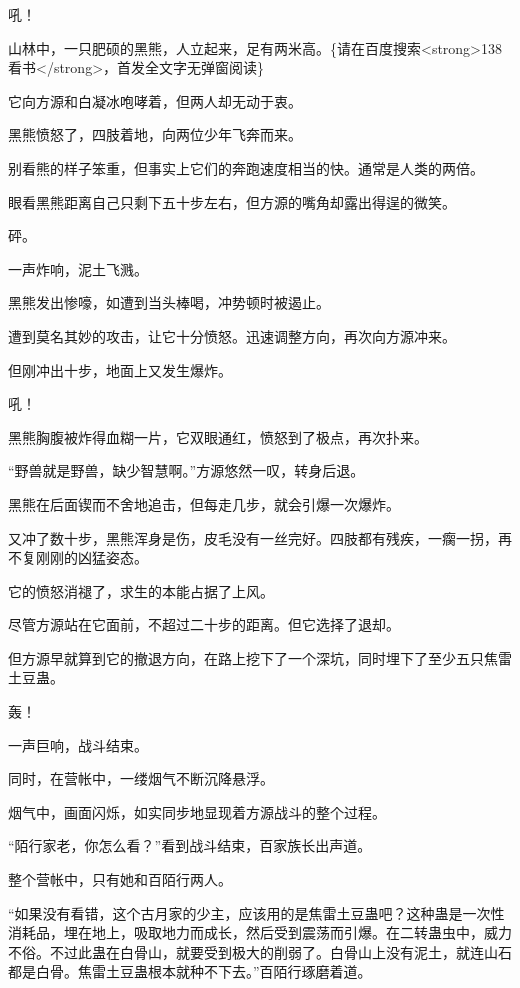 
\begin{this_body}

吼！

山林中，一只肥硕的黑熊，人立起来，足有两米高。\{请在百度搜索<strong>138看书</strong>，首发全文字无弹窗阅读\}

它向方源和白凝冰咆哮着，但两人却无动于衷。

黑熊愤怒了，四肢着地，向两位少年飞奔而来。

别看熊的样子笨重，但事实上它们的奔跑速度相当的快。通常是人类的两倍。

眼看黑熊距离自己只剩下五十步左右，但方源的嘴角却露出得逞的微笑。

砰。

一声炸响，泥土飞溅。

黑熊发出惨嚎，如遭到当头棒喝，冲势顿时被遏止。

遭到莫名其妙的攻击，让它十分愤怒。迅速调整方向，再次向方源冲来。

但刚冲出十步，地面上又发生爆炸。

吼！

黑熊胸腹被炸得血糊一片，它双眼通红，愤怒到了极点，再次扑来。

“野兽就是野兽，缺少智慧啊。”方源悠然一叹，转身后退。

黑熊在后面锲而不舍地追击，但每走几步，就会引爆一次爆炸。

又冲了数十步，黑熊浑身是伤，皮毛没有一丝完好。四肢都有残疾，一瘸一拐，再不复刚刚的凶猛姿态。

它的愤怒消褪了，求生的本能占据了上风。

尽管方源站在它面前，不超过二十步的距离。但它选择了退却。

但方源早就算到它的撤退方向，在路上挖下了一个深坑，同时埋下了至少五只焦雷土豆蛊。

轰！

一声巨响，战斗结束。

同时，在营帐中，一缕烟气不断沉降悬浮。

烟气中，画面闪烁，如实同步地显现着方源战斗的整个过程。

“陌行家老，你怎么看？”看到战斗结束，百家族长出声道。

整个营帐中，只有她和百陌行两人。

“如果没有看错，这个古月家的少主，应该用的是焦雷土豆蛊吧？这种蛊是一次性消耗品，埋在地上，吸取地力而成长，然后受到震荡而引爆。在二转蛊虫中，威力不俗。不过此蛊在白骨山，就要受到极大的削弱了。白骨山上没有泥土，就连山石都是白骨。焦雷土豆蛊根本就种不下去。”百陌行琢磨着道。


\end{this_body}
